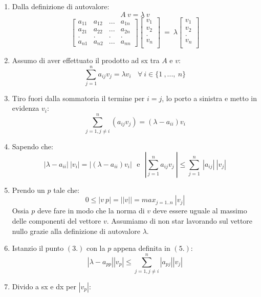 \documentclass{article}
\begin{document}
\begin{enumerate}
    \item Dalla definizione di autovalore:
    \[ A\:v = \lambda \: v \]
   \[ \begin{bmatrix}
    a_{11} & a_{12} & ... & a_{1n}\\
    a_{21} & a_{22} & ... & a_{2n}\\
    . & . & . & . \\
    a_{n1} & a_{n2} & ... & a_{nn}
    \end{bmatrix} 
    \begin{bmatrix}
        v_1 \\
        v_2 \\
        . \\
        v_n \\
    \end{bmatrix} \: = \: \lambda 
    \begin{bmatrix}
        v_1 \\
        v_2 \\
        . \\
        v_n \\
    \end{bmatrix} \]
    \vspace*{5px}
    \item Assumo di aver effettuato il prodotto ad sx tra $A$ e $v$:
    \[ \sum_{j=1}^{n} a_{ij}v_{j} = \lambda v_{i} \:\:\:\: \forall \: i \in \{ 1\:,... ,\:n \}  \]
    \item Tiro fuori dalla sommatoria il termine per $i=j$, lo porto a sinistra e metto in evidenza $v_{i}$:
    \[ \sum_{j=1,j\neq i}^{n} (a_{ij}v_{j})  = (\lambda - a_{ii} )v_{i} \]
    \newpage
    \item Sapendo che:
    \[ \boxed{|\lambda-a_{ii}|\:|v_{i}|  =  | (\lambda - a_{ii})v_{i} |} \:\:\: \text{e} \:\:\: \boxed{|\sum_{j=1}^{n} a_{ij}v_{j} \:  | \leq \sum_{j=1}^{n} \:|a_{ij}|\:|v_{j}|} \]
    \item Prendo un $p$ tale che:
    \[ 0 \leq |v\:p| = ||v|| = max_{j=1..n} \: |v_{j}| \]
    Ossia $p$ deve fare in modo che la norma di $v$ deve essere uguale al massimo delle componenti del vettore $v$. Assumiamo di non star lavorando sul vettore nullo grazie alla definizione di autovalore $\lambda$.
    \item Istanzio il punto $(3.)$ con la $p$ appena definita in $(5.)$:
    \[ |\lambda - a_{pp }|  |v_{p}| \leq \sum_{j=1,j \neq i}^{n} |a_{pj}| |v_{j}| \]
    \item Divido a sx e dx per $|v_{p}|$:

\end{enumerate}
\end{document}
